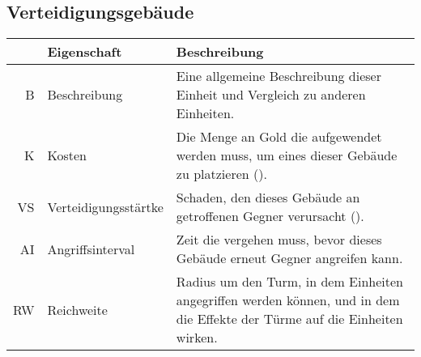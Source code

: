 \subsection{Verteidigungsgebäude}

\begin{table}[htbp]
  \caption{Eigenschaften von Verteidigungsgebäuden}
  \label{tab:defend-props}
  \small
  \begin{longtabu}{rlX}
    \toprule\rowfont{\itshape}
    & Eigenschaft & Beschreibung \\
    \midrule

    B  & Beschreibung
       & Eine allgemeine Beschreibung dieser Einheit und Vergleich zu anderen
         Einheiten. \\
    K  & Kosten
       & Die Menge an Gold die aufgewendet werden muss, um eines dieser
         Gebäude zu platzieren (). \\
    VS & Verteidigungsstärtke
       & Schaden, den dieses Gebäude an getroffenen Gegner verursacht
         (). \\
    AI & Angriffsinterval
       & Zeit die vergehen muss, bevor dieses Gebäude erneut Gegner angreifen
         kann. \\
    RW & Reichweite
       & Radius um den Turm, in dem Einheiten angegriffen werden können, und in
         dem die Effekte der Türme auf die Einheiten wirken. \\

    \bottomrule
  \end{longtabu}
\end{table}

